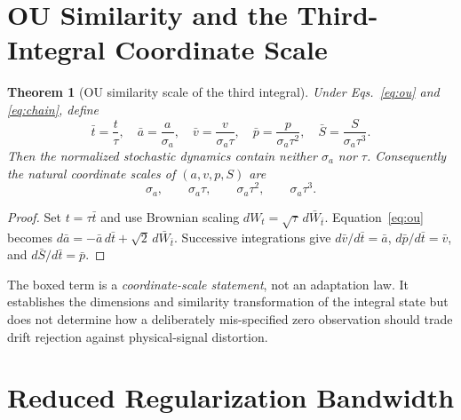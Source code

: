 \documentclass[conference]{IEEEtran}
\newtheorem{theorem}{Theorem}
\theoremstyle{remark}
\begin{document}
\section{OU Similarity and the Third-Integral Coordinate Scale}
\label{sec:similarity}

\begin{theorem}[OU similarity scale of the third integral]
\label{thm:similarity}
Under Eqs.~\eqref{eq:ou} and \eqref{eq:chain}, define
\begin{equation}
 \bar t=\frac{t}{\tau},\quad
 \bar a=\frac{a}{\sigma_a},\quad
 \bar v=\frac{v}{\sigma_a\tau},\quad
 \bar p=\frac{p}{\sigma_a\tau^2},\quad
 \bar S=\frac{S}{\sigma_a\tau^3}.
 \label{eq:nondim}
\end{equation}
Then the normalized stochastic dynamics contain neither $\sigma_a$ nor $\tau$.
Consequently the natural coordinate scales of $(a,v,p,S)$ are
\begin{equation}
 \sigma_a,\qquad \sigma_a\tau,\qquad
 \sigma_a\tau^2,\qquad \boxed{\sigma_a\tau^3}.
 \label{eq:natural-scales}
\end{equation}
\end{theorem}

\begin{proof}
Set $t=\tau\bar t$ and use Brownian scaling
$dW_t=\sqrt{\tau}\,d\bar W_{\bar t}$.  Equation~\eqref{eq:ou} becomes
$d\bar a=-\bar a\,d\bar t+\sqrt2\,d\bar W_{\bar t}$.  Successive integrations
give $d\bar v/d\bar t=\bar a$, $d\bar p/d\bar t=\bar v$, and
$d\bar S/d\bar t=\bar p$.
\end{proof}

The boxed term is a \emph{coordinate-scale statement}, not an adaptation law.
It establishes the dimensions and similarity transformation of the integral
state but does not determine how a deliberately mis-specified zero observation
should trade drift rejection against physical-signal distortion.

\section{Reduced Regularization Bandwidth}
\label{sec:bandwidth}
\end{document}
